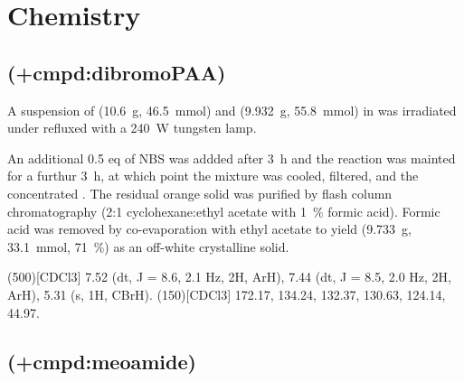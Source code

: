 \section{Chemistry}


\subsection{ (\cmpd+{cmpd:dibromoPAA})}

\begin{experimental}[delta=(ppm),pos-number=sub,use-equal]

A suspension of  (\SI{10.6}{\gram}, \SI{46.5}{\milli\mol}) and  (\SI{9.932}{\gram}, \SI{55.8}{\milli\mol}) in  was irradiated under refluxed with a \SI{240}{\watt} tungsten lamp.

An additional 0.5 eq of NBS was addded after \SI{3}{\hour} and the reaction was mainted for a furthur \SI{3}{\hour}, at which point the mixture was cooled, filtered, and the concentrated \invacuo. The residual orange solid was purified by flash column chromatography (2:1 cyclohexane:ethyl acetate with \SI{1}{\percent} formic acid). Formic acid was removed by co-evaporation with ethyl acetate to yield  (\SI{9.733}{\gram}, \SI{33.1}{\milli\mole}, \SI{71}{\percent}) as an off-white crystalline solid.

\NMR(500)[CDCl3] 7.52 (dt, J = 8.6, 2.1 Hz, 2H, ArH), 7.44 (dt, J = 8.5, 2.0 Hz, 2H, ArH), 5.31 (s, 1H, CBrH).
%
(150)[CDCl3] 172.17, 134.24, 132.37, 130.63, 124.14, 44.97.


%
\end{experimental}


\subsection{ (\cmpd+{cmpd:meoamide})}

